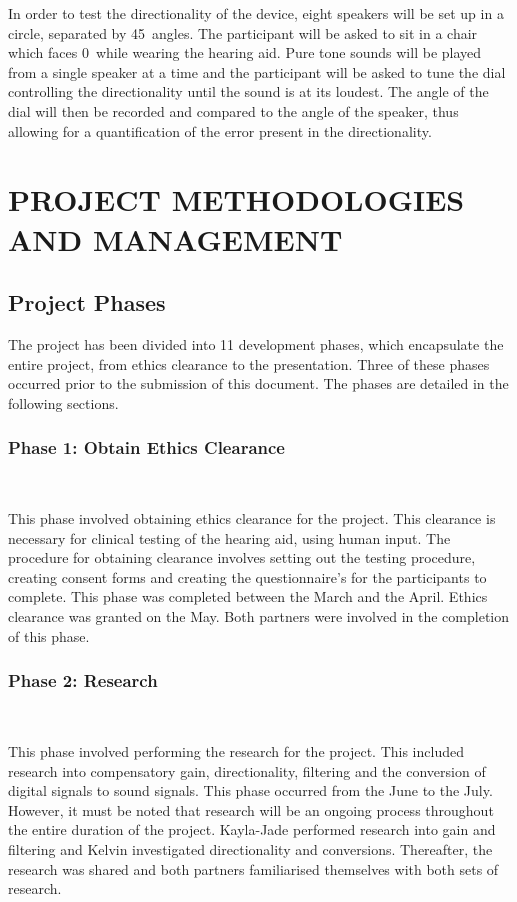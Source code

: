 \documentclass[10pt,twocolumn]{witseiepaper}
\begin{document}
In order to test the directionality of the device, eight speakers will be set up in a circle, separated by 45\textdegree\ angles. The participant will be asked to sit in a chair which faces 0\textdegree\  while wearing the hearing aid. Pure tone sounds will be played from a single speaker at a time and the participant will be asked to tune the dial controlling the directionality until the sound is at its loudest. The angle of the dial will then be recorded and compared to the angle of the speaker, thus allowing for a quantification of the error present in the directionality. 

\section{PROJECT METHODOLOGIES AND MANAGEMENT}
\subsection{Project Phases}
The project has been divided into 11 development phases, which encapsulate the entire project, from ethics clearance to the presentation. Three of these phases occurred prior to the submission of this document. The phases are detailed in the following sections.

\subsubsection*{Phase 1: Obtain Ethics Clearance} $    $

This phase involved obtaining ethics clearance for the project. This clearance is necessary for clinical testing of the hearing aid, using human input. The procedure for obtaining clearance involves setting out the testing procedure, creating consent forms and creating the questionnaire's for the participants to complete. This phase was completed between the  March and the  April. Ethics clearance was granted on the  May. Both partners were involved in the completion of this phase.

\subsubsection*{Phase 2: Research} $    $

This phase involved performing the research for the project. This included research into compensatory gain, directionality, filtering and the conversion of digital signals to sound signals. This phase occurred from the  June to the  July. However, it must be noted that research will be an ongoing process throughout the entire duration of the project. Kayla-Jade performed research into gain and filtering and Kelvin investigated directionality and conversions. Thereafter, the research was shared and both partners familiarised themselves with both sets of research.
\end{document}
